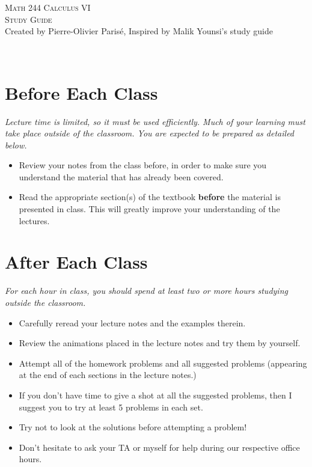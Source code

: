 \documentclass[12pt]{amsart}
\begin{document}
\thispagestyle{empty}

\noindent\hrulefill
\begin{center}
\Large{\textsc{Math 244 Calculus VI} }\\
\textsc{Study Guide}\\
\small{Created by Pierre-Olivier Paris{\'e}, Inspired by Malik Younsi's study guide}
\end{center}
\hrulefill \\

\section*{Before Each Class}
\textit{Lecture time is limited, so it must be used efficiently. Much of your learning must take place outside of the classroom. You are expected to be prepared as detailed below.}
	\begin{itemize}
	\item Review your notes from the class before, in order to make sure you understand the material that has already been covered.
	\item Read the appropriate section(s) of the textbook \textbf{before} the material is presented in class. This will greatly improve your understanding of the lectures.
	\end{itemize}
	
\section*{After Each Class}
\textit{For each hour in class, you should spend at least two or more hours studying outside the classroom.}
	\begin{itemize}
	\item Carefully reread your lecture notes and the examples therein.
	\item Review the animations placed in the lecture notes and try them by yourself. 
	\item Attempt all of the homework problems and all suggested problems (appearing at the end of each sections in the lecture notes.)
	\item If you don't have time to give a shot at all the suggested problems, then I suggest you to try at least 5 problems in each set.
	\item Try not to look at the solutions before attempting a problem!
	\item Don't hesitate to ask your TA or myself for help during our respective office hours.
	\end{itemize}
	
\end{document}
